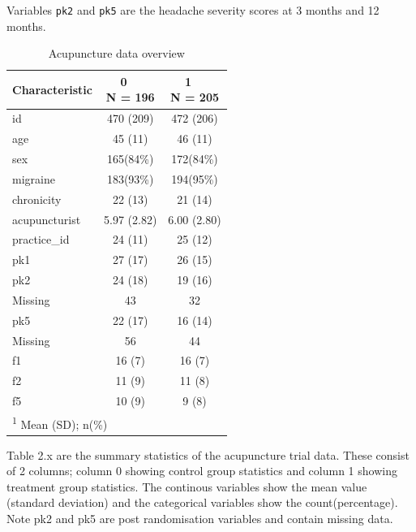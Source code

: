 \documentclass{article}
\begin{document}
Variables \texttt{pk2} and \texttt{pk5} are the headache severity scores
at 3 months and 12 months.

\begin{table}[!h]
\centering
\caption{Acupuncture data overview}
\centering
\begin{tabular}[t]{l|c|c}
\hline
\textbf{Characteristic} & \makecell[c]{\textbf{0}\ \ \\N = 196} & \makecell[c]{\textbf{1}\ \ \\N = 205}\\
\hline
id & 470 (209) & 472 (206)\\
\hline
age & 45 (11) & 46 (11)\\
\hline
sex & 165(84\%) & 172(84\%)\\
\hline
migraine & 183(93\%) & 194(95\%)\\
\hline
chronicity & 22 (13) & 21 (14)\\
\hline
acupuncturist & 5.97 (2.82) & 6.00 (2.80)\\
\hline
practice\_id & 24 (11) & 25 (12)\\
\hline
pk1 & 27 (17) & 26 (15)\\
\hline
pk2 & 24 (18) & 19 (16)\\
\hline
\hspace{1em}Missing & 43 & 32\\
\hline
pk5 & 22 (17) & 16 (14)\\
\hline
\hspace{1em}Missing & 56 & 44\\
\hline
f1 & 16 (7) & 16 (7)\\
\hline
f2 & 11 (9) & 11 (8)\\
\hline
f5 & 10 (9) & 9 (8)\\
\hline
\multicolumn{3}{l}{\rule{0pt}{1em}\textsuperscript{1} Mean (SD); n(\%)}\\
\end{tabular}
\end{table}

Table 2.x are the summary statistics of the acupuncture trial data.
These consist of 2 columns; column 0 showing control group statistics
and column 1 showing treatment group statistics. The continous variables
show the mean value (standard deviation) and the categorical variables
show the count(percentage). Note pk2 and pk5 are post randomisation
variables and contain missing data.
\end{document}
